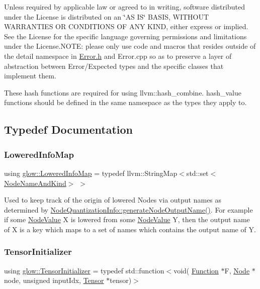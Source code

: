 Unless required by applicable law or agreed to in writing, software distributed under the License is distributed on an \char`\"{}\+A\+S I\+S\char`\"{} B\+A\+S\+IS, W\+I\+T\+H\+O\+UT W\+A\+R\+R\+A\+N\+T\+I\+ES OR C\+O\+N\+D\+I\+T\+I\+O\+NS OF A\+NY K\+I\+ND, either express or implied. See the License for the specific language governing permissions and limitations under the License.\+N\+O\+TE\+: please only use code and macros that resides outside of the detail namespace in \hyperlink{_error_8h_source}{Error.\+h} and Error.\+cpp so as to preserve a layer of abstraction between Error/\+Expected types and the specific classes that implement them.

These hash functions are required for using llvm\+::hash\+\_\+combine. hash\+\_\+value functions should be defined in the same namespace as the types they apply to. 

\subsection{Typedef Documentation}
\mbox{\label{namespaceglow_a419aca63ca48becda137d774dd06493c}} 
\subsubsection{\texorpdfstring{Lowered\+Info\+Map}{LoweredInfoMap}}
{\footnotesize\ttfamily using \hyperlink{namespaceglow_a419aca63ca48becda137d774dd06493c}{glow\+::\+Lowered\+Info\+Map} = typedef llvm\+::\+String\+Map$<$std\+::set$<$\hyperlink{structglow_1_1_node_name_and_kind}{Node\+Name\+And\+Kind}$>$ $>$}

Used to keep track of the origin of lowered Nodes via output names as determined by \hyperlink{structglow_1_1_node_quantization_info_a95eecb61266bd5b736d50b7904a6c95d}{Node\+Quantization\+Info\+::generate\+Node\+Output\+Name()}. For example if some \hyperlink{structglow_1_1_node_value}{Node\+Value} X is lowered from some \hyperlink{structglow_1_1_node_value}{Node\+Value} Y, then the output name of X is a key which maps to a set of names which contains the output name of Y. \mbox{\label{namespaceglow_a32fc0e338408955f80a23cc7e0c0c82e}} 
\subsubsection{\texorpdfstring{Tensor\+Initializer}{TensorInitializer}}
{\footnotesize\ttfamily using \hyperlink{namespaceglow_a32fc0e338408955f80a23cc7e0c0c82e}{glow\+::\+Tensor\+Initializer} = typedef std\+::function$<$void( \hyperlink{classglow_1_1_function}{Function} $\ast$F, \hyperlink{classglow_1_1_node}{Node} $\ast$node, unsigned input\+Idx, \hyperlink{classglow_1_1_tensor}{Tensor} $\ast$tensor)$>$}

